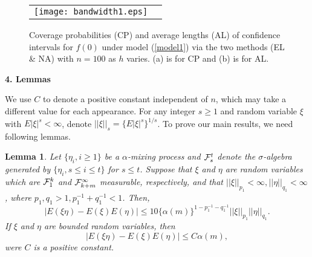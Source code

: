 \documentclass[12pt]{article}
\newtheorem{lemm}{\sc Lemma}
\renewcommand{\baselinestretch}{1.25}
\def\vv{1.3}
\begin{document}
\renewcommand{\baselinestretch}{\vv}


\begin{figure}[htbp]
\begin{tabular}{cc}
\texttt{[image: bandwidth1.eps]}  %
\end{tabular}
\caption{ Coverage probabilities (CP) and average lengths (AL) of confidence intervals for  $f(0)$ under model (\ref{model1})  via the two methods (EL \& NA) with $n=100$ as $h$ varies. (a) is for CP and (b) is for AL.   }
    \label{fig3}
\end{figure}






\bigskip
\setcounter{section}{4}
\setcounter{equation}{0}
 \noindent
{\bf 4. Lemmas}
\bigskip

We use $C$ to denote a positive constant independent of $n$, which
may take a different value for each appearance.
For any integer $s\geq 1$ and random variable $\xi$ with  $E|\xi|^s<\infty$, denote $||\xi||_s=\{E|\xi|^s\}^{1/s}$.   To prove our main results,
we need following lemmas.

\begin{lemm}\label{lemm4.01}
Let $\{\eta_i, i\geq 1\}$ be a $\alpha$-mixing process and
${\cal{F}}^t_s$ denote the $\sigma$-algebra generated by $\{\eta_i,
s\leq i\leq t\}$ for $s\leq t$. Suppose that $\xi$ and $\eta$ are
random variables which are ${\cal{F}}^k_1$ and ${\cal{F}}^{\infty}_{k+m}$ measurable, respectively, and
that $||\xi||_{p_1}<\infty, ||\eta||_{q_1}< \infty$, where $p_1, q_1>1, p_1^{-1}+q_1^{-1}<1$. Then,
\[
|E(\xi\eta)-E(\xi)E(\eta)|\leq 10\{\alpha(m)\}^{1-p_1^{-1}-q_1^{-1}}||\xi||_{p_1}||\eta||_{q_1}.
\]
If $\xi$ and $\eta$ are bounded
random variables, then
\[
|E(\xi\eta)-E(\xi)E(\eta)|\leq C\alpha(m),
\]
were $C$ is a positive constant.
\end{lemm}
\end{document}
